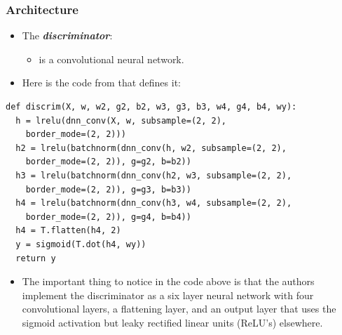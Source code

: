 \documentclass{beamer}
\begin{document}
\begin{frame}[fragile]
\frametitle{Architecture}
\begin{itemize}
\item The \textbf{\textit{discriminator}}:
  \begin{itemize}
    \item is a convolutional neural network. 
  \end{itemize}
\item Here is the code from \cite{dcganCode} that defines it:
\end{itemize}
\begin{tiny}
\begin{lstlisting}
def discrim(X, w, w2, g2, b2, w3, g3, b3, w4, g4, b4, wy):
  h = lrelu(dnn_conv(X, w, subsample=(2, 2), 
    border_mode=(2, 2)))
  h2 = lrelu(batchnorm(dnn_conv(h, w2, subsample=(2, 2), 
    border_mode=(2, 2)), g=g2, b=b2))
  h3 = lrelu(batchnorm(dnn_conv(h2, w3, subsample=(2, 2), 
    border_mode=(2, 2)), g=g3, b=b3))
  h4 = lrelu(batchnorm(dnn_conv(h3, w4, subsample=(2, 2), 
    border_mode=(2, 2)), g=g4, b=b4))
  h4 = T.flatten(h4, 2)
  y = sigmoid(T.dot(h4, wy))
  return y
\end{lstlisting}
\end{tiny}
\begin{itemize}
  \item 
    The important thing to notice in the code above is that the authors implement 
    the discriminator as a six layer neural network with four convolutional layers,
    a flattening layer, and an output layer that uses the sigmoid activation but 
    leaky rectified linear units (ReLU's) elsewhere.
\end{itemize}
\end{frame}

\end{document}
